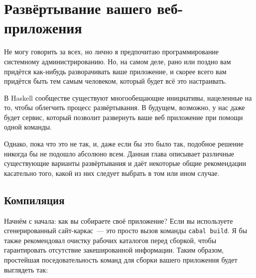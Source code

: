 \chapter{Развёртывание вашего веб-приложения}\label{chap:deploying}
%
%

Не могу говорить за всех, но лично я предпочитаю программирование системному администрированию. Но, на самом деле, рано или поздно вам придётся как-нибудь разворачивать ваше приложение, и скорее всего вам придётся быть тем самым человеком, который будет всё это настраивать. 

%
В Haskell сообществе существуют многообещающие инициативы, нацеленные на то, чтобы облегчить процесс развёртывания. В будущем, возможно, у нас даже будет сервис, который позволит развернуть ваше веб приложение при помощи одной команды.

%
Однако, пока что это не так, и, даже если бы это было так, подобное решение никогда бы не подошло абсолюно всем. Данная глава описывает различные существующие варианты развёртывания и даёт некоторые общие рекомендации касательно того, какой из них следует выбрать в том или ином случае.

\section{Компиляция}
%
%
Начнём с начала: как вы собираете своё приложение? Если вы используете сгенерированный сайт-каркас~--- это просто вызов команды \lstinline{cabal build}. Я бы также рекомендовал очистку рабочих каталогов перед сборкой, чтобы гарантировать отсутствие закешированной информации. Таким образом, простейшая поседовательность команд для сборки вашего приложения будет выглядеть так:

